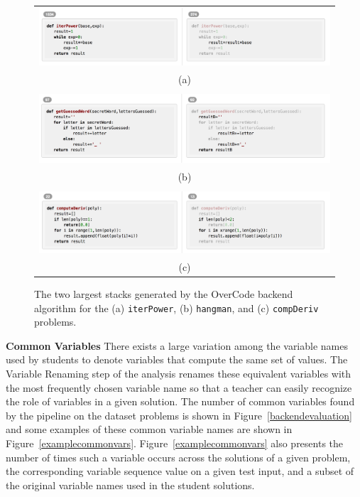 \documentclass[12pt,twoside]{mitthesis}
\newcommand \codevar[1]{\texttt{#1}}
\begin{document}
\begin{figure}[h!]
\begin{tabular}{c}
\\
\includegraphics[scale=0.42]{Body/figures/overcode/iterpower-toptwo}
\\ (a) \\ \\
\includegraphics[scale=0.42]{Body/figures/overcode/hangman-toptwo}
\\ (b) \\ \\
\includegraphics[scale=0.42]{Body/figures/overcode/compderiv-toptwo}
\\ (c) \\
\end{tabular}
\caption{The two largest stacks generated by the OverCode backend algorithm for the (a) \codevar{iterPower}, (b) \codevar{hangman}, and (c)  \codevar{compDeriv} problems.}
\label{toptwostacks}
\end{figure}

{\bf Common Variables} There exists a large variation among the variable names used by students to denote variables that compute the same set of values. The Variable Renaming step of the analysis renames these equivalent variables with the most frequently chosen variable name so that a teacher can easily recognize the role of variables in a given solution. The number of common variables found by the pipeline on the dataset problems is shown in Figure~\ref{backendevaluation} and some examples of these common variable names are shown in Figure~\ref{examplecommonvars}. Figure~\ref{examplecommonvars} also presents the number of times such a variable occurs across the solutions of a given problem, the corresponding variable sequence value on a given test input, and a subset of the original variable names used in the student solutions. 
\end{document}
